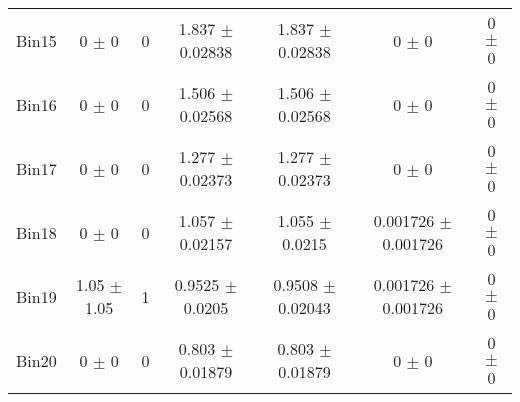 \begin{tabular}{@{\extracolsep{4pt}}lcccccc@{}}
     Bin15 & 0 $\pm$ 0 & 0 & 1.837 $\pm$ 0.02838 & 1.837 $\pm$ 0.02838 & 0 $\pm$ 0 & 0 $\pm$ 0 \\ 
     Bin16 & 0 $\pm$ 0 & 0 & 1.506 $\pm$ 0.02568 & 1.506 $\pm$ 0.02568 & 0 $\pm$ 0 & 0 $\pm$ 0 \\ 
     Bin17 & 0 $\pm$ 0 & 0 & 1.277 $\pm$ 0.02373 & 1.277 $\pm$ 0.02373 & 0 $\pm$ 0 & 0 $\pm$ 0 \\ 
     Bin18 & 0 $\pm$ 0 & 0 & 1.057 $\pm$ 0.02157 & 1.055 $\pm$ 0.0215 & 0.001726 $\pm$ 0.001726 & 0 $\pm$ 0 \\ 
     Bin19 & 1.05 $\pm$ 1.05 & 1 & 0.9525 $\pm$ 0.0205 & 0.9508 $\pm$ 0.02043 & 0.001726 $\pm$ 0.001726 & 0 $\pm$ 0 \\ 
     Bin20 & 0 $\pm$ 0 & 0 & 0.803 $\pm$ 0.01879 & 0.803 $\pm$ 0.01879 & 0 $\pm$ 0 & 0 $\pm$ 0 \\ 
\hline\hline
  \end{tabular}
